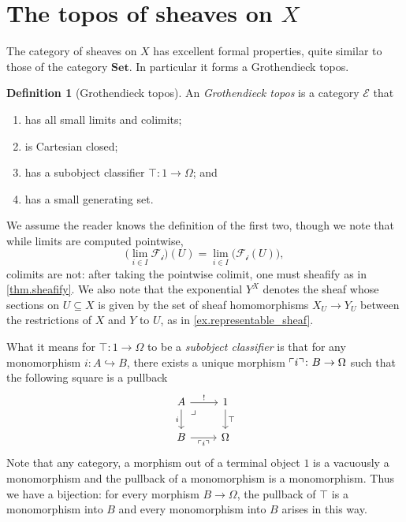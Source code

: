 \documentclass[11pt, oneside, article]{memoir}
\theoremstyle{plain}
\theoremstyle{definition}
\newtheorem{definition}[theorem]{Definition}
\theoremstyle{remark}
\renewcommand{\ss}{\subseteq}
\DeclarePairedDelimiter{\classify}{\ulcorner}{\urcorner}
\newcommand{\cat}[1]{\mathcal{#1}}
\newcommand{\Cat}[1]{\mathbf{#1}}
\newcommand{\fun}[1]{\mathcal{#1}}
\newcommand{\sheaf}[1]{\fun{#1}}
\newcommand{\smset}{\Cat{Set}}
\newcommand{\inj}{\hookrightarrow}
\begin{document}
\section{The topos of sheaves on $X$}

The category of sheaves on $X$ has excellent formal properties, quite similar to those of the category $\smset$. In particular it forms a Grothendieck topos. 

\begin{definition}[Grothendieck topos]\label{def.Grothendieck_topos}
An \emph{Grothendieck topos} is a category $\cat{E}$ that 
\begin{enumerate}
	\item has all small limits and colimits;
	\item is Cartesian closed;
	\item has a subobject classifier $\top\colon 1\to\Omega$; and
	\item has a small generating set.
\end{enumerate}
\end{definition}
We assume the reader knows the definition of the first two, though we note that while limits are computed pointwise,
\[\Big(\lim_{i\in I}\sheaf{F_i}\Big)(U)=\lim_{i\in I}\big(\sheaf{F_i}(U)\big),\]
colimits are not: after taking the pointwise colimit, one must sheafify as in \cref{thm.sheafify}. We also note that the exponential $Y^X$ denotes the sheaf whose sections on $U\ss X$ is given by the set of sheaf homomorphisms $X_U\to Y_U$ between the restrictions of $X$ and $Y$ to $U$, as in \cref{ex.representable_sheaf}.

 What it means for $\top\colon 1\to \Omega$ to be a \emph{subobject classifier} is that for any monomorphism $i\colon A\inj B$, there exists a unique morphism $\classify{i}\colon B\to\Omega$ such that the following square is a pullback
\begin{equation}\label{eqn.subobject_classifier}
\begin{tikzcd}
	A\ar[r, "!"]\ar[d, "i"']&
	1\ar[d, "\top"]\\
	B\ar[r, "\classify{i}"']&
	\Omega\ar[ul, phantom, very near end, "\lrcorner"]
\end{tikzcd}
\end{equation}
Note that any category, a morphism out of a terminal object $1$ is a vacuously a monomorphism and the pullback of a monomorphism is a monomorphism. Thus we have a bijection: for every morphism $B\to \Omega$, the pullback of $\top$ is a monomorphism into $B$ and every monomorphism into $B$ arises in this way.
\end{document}
